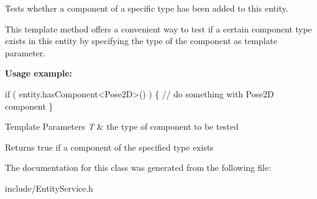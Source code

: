Tests whether a component of a specific type has been added to this entity.

This template method offers a convenient way to test if a certain component type exists in this entity by specifying the type of the component as template parameter.

{\bfseries Usage example\+:} 
\begin{DoxyCode}
\textcolor{keywordflow}{if} ( entity.hasComponent<Pose2D>() ) \{
    \textcolor{comment}{// do something with Pose2D component}
\}
\end{DoxyCode}



\begin{DoxyTemplParams}{Template Parameters}
{\em T} & the type of component to be tested \\
\hline
\end{DoxyTemplParams}
\begin{DoxyReturn}{Returns}
{\ttfamily true} if a component of the specified type exists 
\end{DoxyReturn}


The documentation for this class was generated from the following file\+:\begin{DoxyCompactItemize}
\item 
include/Entity\+Service.\+h\end{DoxyCompactItemize}
